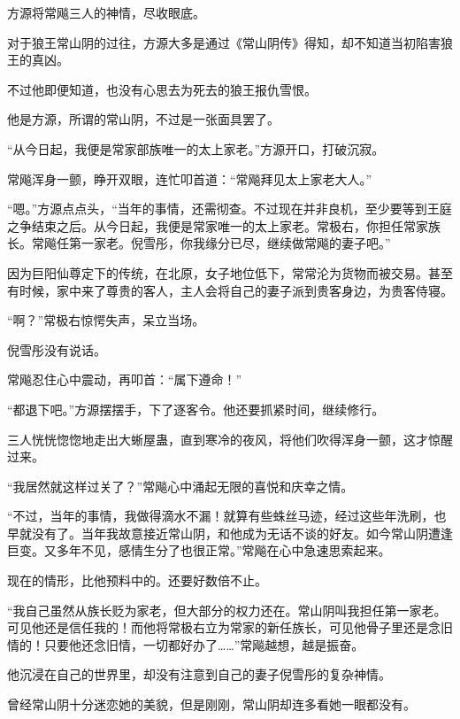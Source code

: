 
\begin{this_body}



方源将常飚三人的神情，尽收眼底。

对于狼王常山阴的过往，方源大多是通过《常山阴传》得知，却不知道当初陷害狼王的真凶。

不过他即便知道，也没有心思去为死去的狼王报仇雪恨。

他是方源，所谓的常山阴，不过是一张面具罢了。

“从今日起，我便是常家部族唯一的太上家老。”方源开口，打破沉寂。

常飚浑身一颤，睁开双眼，连忙叩首道：“常飚拜见太上家老大人。”

“嗯。”方源点点头，“当年的事情，还需彻查。不过现在并非良机，至少要等到王庭之争结束之后。从今日起，我便是常家唯一的太上家老。常极右，你担任常家族长。常飚任第一家老。倪雪彤，你我缘分已尽，继续做常飚的妻子吧。”

因为巨阳仙尊定下的传统，在北原，女子地位低下，常常沦为货物而被交易。甚至有时候，家中来了尊贵的客人，主人会将自己的妻子派到贵客身边，为贵客侍寝。

“啊？”常极右惊愕失声，呆立当场。

倪雪彤没有说话。

常飚忍住心中震动，再叩首：“属下遵命！”

“都退下吧。”方源摆摆手，下了逐客令。他还要抓紧时间，继续修行。

三人恍恍惚惚地走出大蜥屋蛊，直到寒冷的夜风，将他们吹得浑身一颤，这才惊醒过来。

“我居然就这样过关了？”常飚心中涌起无限的喜悦和庆幸之情。

“不过，当年的事情，我做得滴水不漏！就算有些蛛丝马迹，经过这些年洗刷，也早就没有了。当年我故意接近常山阴，和他成为无话不谈的好友。如今常山阴遭逢巨变。又多年不见，感情生分了也很正常。”常飚在心中急速思索起来。

现在的情形，比他预料中的。还要好数倍不止。

“我自己虽然从族长贬为家老，但大部分的权力还在。常山阴叫我担任第一家老。可见他还是信任我的！而他将常极右立为常家的新任族长，可见他骨子里还是念旧情的！只要他还念旧情，一切都好办了……”常飚越想，越是振奋。

他沉浸在自己的世界里，却没有注意到自己的妻子倪雪彤的复杂神情。

曾经常山阴十分迷恋她的美貌，但是刚刚，常山阴却连多看她一眼都没有。


\end{this_body}
